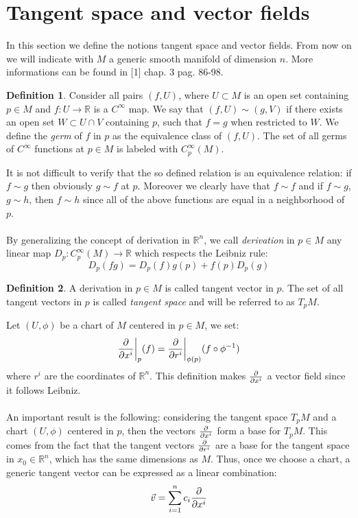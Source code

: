 \documentclass[12pt,a4paper]{report}
\theoremstyle{definition}
\newtheorem{Def}{Definition}[chapter]
\theoremstyle{Theorem}
\theoremstyle{definition}
\theoremstyle{definition}
\begin{document}
	\section{Tangent space and vector fields}
	In this section we define the notions tangent space and vector fields. From now on we will indicate with $M$ a generic smooth manifold of dimension $n$. More informations can be found in [1] chap. 3 pag. 86-98.
	\begin{Def}
		Consider all pairs $(f,U)$, where $U\subset M$ is an open set containing $p\in M$ and $f:U\rightarrow \mathbb{R}$ is a $C^\infty$ map. We say that $(f,U)\sim(g,V)$ if there exists an open set $W\subset U\cap V$ containing $p$, such that $f=g$ when restricted to $W$. We define the \textit{germ} of $f$ in $p$ as the equivalence class of $(f,U)$.
		The set of all germs of $C^\infty$ functions at $p\in M$ is labeled with $C^\infty_p(M)$.
	\end{Def}
	It is not difficult to verify that the so defined relation is an equivalence relation: if $f\sim g$ then obviously $g\sim f$ at $p$. Moreover we clearly have that $f\sim f$ and if $f\sim g$, $g\sim h$, then $f\sim h$ since all of the above functions are equal in a neighborhood of $p$.\\
	\\
	By generalizing the concept of derivation in $\mathbb{R}^n$, we call \textit{derivation} in $p\in M$ any linear map $D_p:C^\infty_p(M)\rightarrow\mathbb{R}$ which respects the Leibniz rule:
	$$D_p(fg)=D_p(f)g(p)+f(p)D_p(g)$$
	\begin{Def}
		A derivation in $p\in M$ is called tangent vector in $p$. The set of all tangent vectors in $p$ is called \textit{tangent space} and will be referred to as $T_pM$.
	\end{Def} 
	Let $(U,\phi)$ be a chart of $M$ centered in $p\in M$, we set:
	$${\partial\over \partial x^i}\bigg\rvert_p(f)={\partial\over \partial r^i}\bigg\rvert_{\phi(p)}(f\circ \phi^{-1})$$ where $r^i$ are the coordinates of $\mathbb{R}^n$. This definition makes ${\partial\over \partial x^i}$ a vector field since it follows Leibniz.\\
	\\
	An important result is the following: considering the tangent space $T_pM$ and a chart $(U,\phi)$ centered in $p$, then the vectors $\partial\over \partial x^i$ form a base for $T_pM$. This comes from the fact that the tangent vectors $\partial\over \partial r^i$ are a base for the tangent space in $x_0\in\mathbb{R}^n$, which has the same dimensions as $M$. Thus, once we choose a chart, a generic tangent vector can be expressed as a linear combination: $$\vec{v}=\sum_{i=1}^{n}c_i{\partial\over \partial x^i}$$ 
\end{document}
